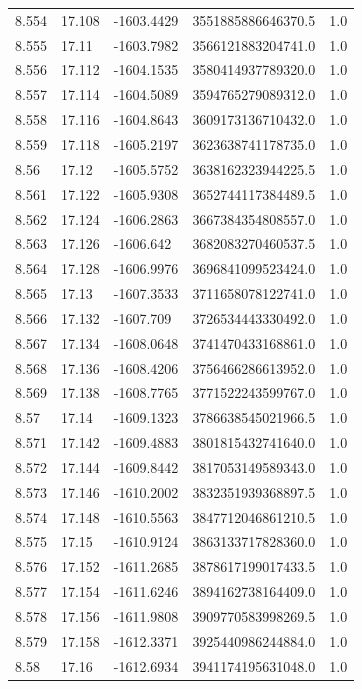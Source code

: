\begin{tabular}{lllll}
8.554 & 17.108 & -1603.4429 & 3551885886646370.5 & 1.0 \\
8.555 & 17.11 & -1603.7982 & 3566121883204741.0 & 1.0 \\
8.556 & 17.112 & -1604.1535 & 3580414937789320.0 & 1.0 \\
8.557 & 17.114 & -1604.5089 & 3594765279089312.0 & 1.0 \\
8.558 & 17.116 & -1604.8643 & 3609173136710432.0 & 1.0 \\
8.559 & 17.118 & -1605.2197 & 3623638741178735.0 & 1.0 \\
8.56 & 17.12 & -1605.5752 & 3638162323944225.5 & 1.0 \\
8.561 & 17.122 & -1605.9308 & 3652744117384489.5 & 1.0 \\
8.562 & 17.124 & -1606.2863 & 3667384354808557.0 & 1.0 \\
8.563 & 17.126 & -1606.642 & 3682083270460537.5 & 1.0 \\
8.564 & 17.128 & -1606.9976 & 3696841099523424.0 & 1.0 \\
8.565 & 17.13 & -1607.3533 & 3711658078122741.0 & 1.0 \\
8.566 & 17.132 & -1607.709 & 3726534443330492.0 & 1.0 \\
8.567 & 17.134 & -1608.0648 & 3741470433168861.0 & 1.0 \\
8.568 & 17.136 & -1608.4206 & 3756466286613952.0 & 1.0 \\
8.569 & 17.138 & -1608.7765 & 3771522243599767.0 & 1.0 \\
8.57 & 17.14 & -1609.1323 & 3786638545021966.5 & 1.0 \\
8.571 & 17.142 & -1609.4883 & 3801815432741640.0 & 1.0 \\
8.572 & 17.144 & -1609.8442 & 3817053149589343.0 & 1.0 \\
8.573 & 17.146 & -1610.2002 & 3832351939368897.5 & 1.0 \\
8.574 & 17.148 & -1610.5563 & 3847712046861210.5 & 1.0 \\
8.575 & 17.15 & -1610.9124 & 3863133717828360.0 & 1.0 \\
8.576 & 17.152 & -1611.2685 & 3878617199017433.5 & 1.0 \\
8.577 & 17.154 & -1611.6246 & 3894162738164409.0 & 1.0 \\
8.578 & 17.156 & -1611.9808 & 3909770583998269.5 & 1.0 \\
8.579 & 17.158 & -1612.3371 & 3925440986244884.0 & 1.0 \\
8.58 & 17.16 & -1612.6934 & 3941174195631048.0 & 1.0 \\

\end{tabular}
